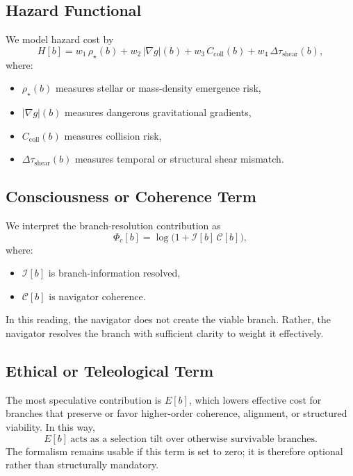 \documentclass[11pt]{article}
\begin{document}
\subsection{Hazard Functional}
We model hazard cost by
\begin{equation}
H[b]
=
w_1 \, \rho_{\star}(b)
+ w_2 \, \lvert \nabla g \rvert (b)
+ w_3 \, C_{\mathrm{coll}}(b)
+ w_4 \, \Delta \tau_{\mathrm{shear}}(b),
\end{equation}
where:
\begin{itemize}[leftmargin=2em]
    \item $\rho_{\star}(b)$ measures stellar or mass-density emergence risk,
    \item $\lvert \nabla g \rvert (b)$ measures dangerous gravitational gradients,
    \item $C_{\mathrm{coll}}(b)$ measures collision risk,
    \item $\Delta \tau_{\mathrm{shear}}(b)$ measures temporal or structural shear mismatch.
\end{itemize}

\subsection{Consciousness or Coherence Term}
We interpret the branch-resolution contribution as
\begin{equation}
\Phi_c[b] = \log\!\bigl(1 + \mathcal{I}[b] \, \mathcal{C}[b]\bigr),
\end{equation}
where:
\begin{itemize}[leftmargin=2em]
    \item $\mathcal{I}[b]$ is branch-information resolved,
    \item $\mathcal{C}[b]$ is navigator coherence.
\end{itemize}
In this reading, the navigator does not create the viable branch. Rather, the navigator resolves the branch with sufficient clarity to weight it effectively.

\subsection{Ethical or Teleological Term}
The most speculative contribution is $E[b]$, which lowers effective cost for branches that preserve or favor higher-order coherence, alignment, or structured viability. In this way,
\begin{equation}
E[b]\ \text{acts as a selection tilt over otherwise survivable branches.}
\end{equation}
The formalism remains usable if this term is set to zero; it is therefore optional rather than structurally mandatory.
\end{document}
